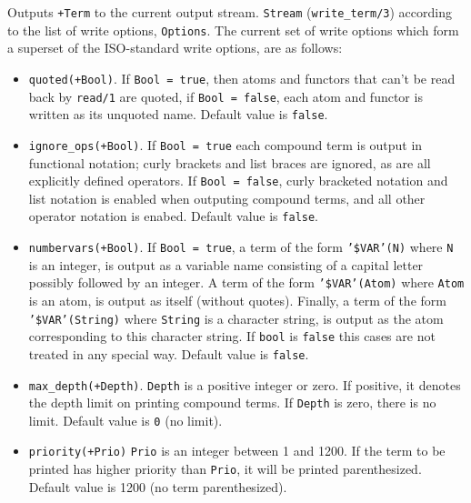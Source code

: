\begin{description}
%
Outputs {\tt +Term} to the current output stream.
{\tt Stream} ({\tt write\_term/3}) according to the list of write
options, {\tt Options}.  The current set of write options which form a
superset of the ISO-standard write options, are as follows:
%
\begin{itemize}
%
\item {\tt quoted(+Bool)}.  If {\tt Bool = true}, then atoms and
    functors that can't be read back by {\tt read/1} are quoted, if
    {\tt Bool = false}, each atom and functor is written as its
    unquoted name. Default value is {\tt false}.
%
\item {\tt ignore\_ops(+Bool)}. If {\tt Bool = true} each compound term
is output in functional notation; curly brackets and list braces are
ignored, as are all explicitly defined operators.  If {\tt Bool =
false}, curly bracketed notation and list notation is enabled when
outputing compound terms, and all other operator notation is
enabed.  Default value is {\tt false}.
%
 \item {\tt numbervars(+Bool)}.  If {\tt Bool = true}, a term of the
form {\tt '\$VAR'(N)} where {\tt N} is an integer, is output as a
variable name consisting of a capital letter possibly followed by an
integer.  A term of the form {\tt '\$VAR'(Atom)} where {\tt Atom} is an
atom, is output as itself (without quotes).  Finally, a term of the
form {\tt '\$VAR'(String)} where {\tt String} is a character string, is
output as the atom corresponding to this character string.  If
{\tt bool} is {\tt false} this cases are not treated in any special
way.  Default value is {\tt false}.
%
%
\item {\tt max\_depth(+Depth)}. {\tt Depth} is a positive integer or
zero. If positive, it denotes the depth limit on printing compound
terms. If {\tt Depth} is zero, there is no limit. Default value is
{\tt 0} (no limit).
%
\item {\tt priority(+Prio)} {\tt Prio} is an integer between 1 and
1200.  If the term to be printed has higher priority than {\tt Prio},
it will be printed parenthesized.  Default value is 1200 (no term
parenthesized).
\end{itemize}


\end{description}
